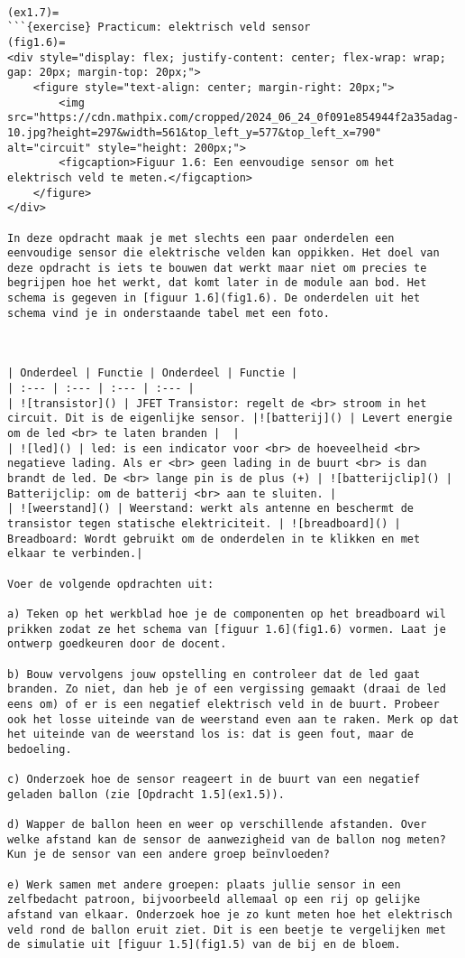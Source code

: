 \begin{verbatim}

(ex1.7)=
```{exercise} Practicum: elektrisch veld sensor
(fig1.6)=
<div style="display: flex; justify-content: center; flex-wrap: wrap; gap: 20px; margin-top: 20px;">
    <figure style="text-align: center; margin-right: 20px;">
        <img src="https://cdn.mathpix.com/cropped/2024_06_24_0f091e854944f2a35adag-10.jpg?height=297&width=561&top_left_y=577&top_left_x=790" alt="circuit" style="height: 200px;">
        <figcaption>Figuur 1.6: Een eenvoudige sensor om het elektrisch veld te meten.</figcaption>
    </figure>
</div>

In deze opdracht maak je met slechts een paar onderdelen een eenvoudige sensor die elektrische velden kan oppikken. Het doel van deze opdracht is iets te bouwen dat werkt maar niet om precies te begrijpen hoe het werkt, dat komt later in de module aan bod. Het schema is gegeven in [figuur 1.6](fig1.6). De onderdelen uit het schema vind je in onderstaande tabel met een foto.



| Onderdeel | Functie | Onderdeel | Functie |
| :--- | :--- | :--- | :--- |
| ![transistor]() | JFET Transistor: regelt de <br> stroom in het circuit. Dit is de eigenlijke sensor. |![batterij]() | Levert energie om de led <br> te laten branden |  |
| ![led]() | led: is een indicator voor <br> de hoeveelheid <br> negatieve lading. Als er <br> geen lading in de buurt <br> is dan brandt de led. De <br> lange pin is de plus (+) | ![batterijclip]() | Batterijclip: om de batterij <br> aan te sluiten. |
| ![weerstand]() | Weerstand: werkt als antenne en beschermt de transistor tegen statische elektriciteit. | ![breadboard]() | Breadboard: Wordt gebruikt om de onderdelen in te klikken en met elkaar te verbinden.|

Voer de volgende opdrachten uit:

a) Teken op het werkblad hoe je de componenten op het breadboard wil prikken zodat ze het schema van [figuur 1.6](fig1.6) vormen. Laat je ontwerp goedkeuren door de docent.

b) Bouw vervolgens jouw opstelling en controleer dat de led gaat branden. Zo niet, dan heb je of een vergissing gemaakt (draai de led eens om) of er is een negatief elektrisch veld in de buurt. Probeer ook het losse uiteinde van de weerstand even aan te raken. Merk op dat het uiteinde van de weerstand los is: dat is geen fout, maar de bedoeling.

c) Onderzoek hoe de sensor reageert in de buurt van een negatief geladen ballon (zie [Opdracht 1.5](ex1.5)).

d) Wapper de ballon heen en weer op verschillende afstanden. Over welke afstand kan de sensor de aanwezigheid van de ballon nog meten? Kun je de sensor van een andere groep beïnvloeden?

e) Werk samen met andere groepen: plaats jullie sensor in een zelfbedacht patroon, bijvoorbeeld allemaal op een rij op gelijke afstand van elkaar. Onderzoek hoe je zo kunt meten hoe het elektrisch veld rond de ballon eruit ziet. Dit is een beetje te vergelijken met de simulatie uit [figuur 1.5](fig1.5) van de bij en de bloem.
\end{verbatim}

